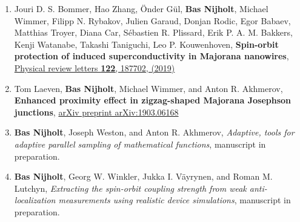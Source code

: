 \begin{enumerate}
\item Jouri D. S. Bommer, Hao Zhang, {\"O}nder G{\"u}l, \textbf{Bas Nijholt}, Michael Wimmer, Filipp N. Rybakov, Julien Garaud, Donjan Rodic, Egor Babaev, Matthias Troyer, Diana Car, S{\'e}bastien R. Plissard, Erik P. A. M. Bakkers, Kenji Watanabe, Takashi Taniguchi, Leo P. Kouwenhoven, \textbf{Spin-orbit protection of induced superconductivity in Majorana nanowires}, \href{}{Physical review letters \textbf{122}, 187702, (2019)}

\item Tom Laeven, \textbf{Bas Nijholt}, Michael Wimmer, and Anton R. Akhmerov, \textbf{Enhanced proximity effect in zigzag-shaped Majorana Josephson junctions}, \href{}{arXiv preprint arXiv:1903.06168}

\item \textbf{Bas Nijholt}, Joseph Weston, and Anton R. Akhmerov, \textit{Adaptive, tools for adaptive parallel sampling of mathematical functions}, manuscript in preparation.

\item \textbf{Bas Nijholt}, Georg W. Winkler, Jukka I. V{\"a}yrynen, and Roman M. Lutchyn, \textit{Extracting the spin-orbit coupling strength from weak anti-localization measurements using realistic device simulations}, manuscript in preparation.

\end{enumerate}

